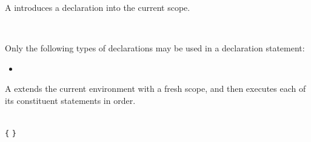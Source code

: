 
\begin{Description}
	A  introduces a declaration into the current scope.
	\end{Description}
	
\begin{Syntax}
	 \\
\end{Syntax}

\begin{Checking}
\end{Checking}
	
Only the following types of declarations may be used in a declaration statement:

\begin{itemize}
\item {}
\end{itemize}


\begin{Description}
A  extends the current environment with a fresh scope,
and then executes each of its constituent statements in order.
\end{Description}

\begin{Syntax}
	 \\
		\lstinline|{| \SynStar \lstinline|}|
\end{Syntax}


\begin{Checking}



\end{Checking}

